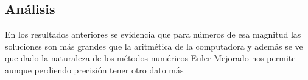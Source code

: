 \documentclass{article}
\begin{document}
          \subsection*{Análisis}
             En los resultados anteriores se evidencia que para números de esa magnitud las soluciones 
             son más grandes que la aritmética de la computadora y además se ve que dado la naturaleza de los
             métodos numéricos Euler Mejorado nos permite aunque perdiendo precisión tener otro dato más

     
\end{document}
